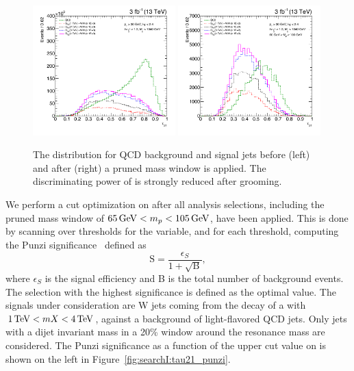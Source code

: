 \begin{figure}[h!]
\centering
\includegraphics[width=0.49\textwidth]{figures/analysis/search1/misc/tau21_ungroomed.pdf}
\includegraphics[width=0.49\textwidth]{figures/analysis/search1/misc/tau21_groomed.pdf}
\caption{The \nsubj distribution for QCD background and signal jets before (left) and after (right) a pruned mass window is applied. The discriminating power of \nsubj is strongly reduced after grooming.}
\label{fig:searchI:tau21_groomedvsungroomed}
\end{figure}
\noindent We perform a cut optimization on \nsubj after all analysis selections, including the pruned mass window of $65 \,\text{Ge\hspace{-.08em}V} < m_{p} < 105 \,\text{Ge\hspace{-.08em}V}$, have been applied. This is done by scanning over thresholds for the \nsubj variable, and for each threshold, computing the Punzi significance~\cite{Punzi:2003bu} defined as
\begin{equation*}
\textrm{S} = \frac{\epsilon_S}{1+\sqrt{\textrm{B}}}  ,
\end{equation*}  
where $\epsilon_S$ is the signal efficiency and B is the total number of background events. The selection with the highest significance is defined as the optimal value. The signals under consideration are W jets coming from the decay of a \BulkG with $1 \,\text{Te\hspace{-.08em}V}< mX < 4 \,\text{Te\hspace{-.08em}V}$, against a background of light-flavored QCD jets. Only jets with a dijet invariant mass in a 20\% window around the resonance mass are considered. The Punzi significance as a function of the upper cut value on \nsubj is shown on the left in Figure~\ref{fig:searchI:tau21_punzi}.
